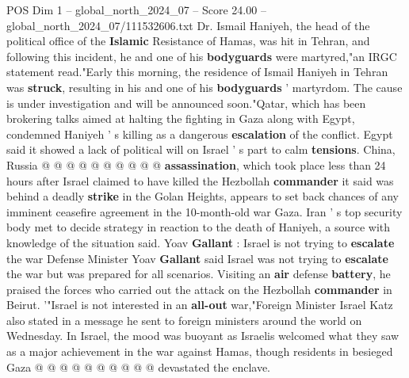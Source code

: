\begin{textsample}{POS Dim 1 – global\_north\_2024\_07 – Score 24.00 – global\_north\_2024\_07/111532606.txt}
Dr.
Ismail Haniyeh, the head of the political office of the \textbf{Islamic} Resistance of Hamas, was hit in Tehran, and following this incident, he and one of his \textbf{bodyguards} were martyred,"an IRGC statement read."Early this morning, the residence of Ismail Haniyeh in Tehran was \textbf{struck}, resulting in his and one of his \textbf{bodyguards} ' martyrdom.
The cause is under investigation and will be announced soon."Qatar, which has been brokering talks aimed at halting the fighting in Gaza along with Egypt, condemned Haniyeh ' s killing as a dangerous \textbf{escalation} of the conflict.
Egypt said it showed a lack of political will on Israel ' s part to calm \textbf{tensions}.
China, Russia @ @ @ @ @ @ @ @ @ @ \textbf{assassination}, which took place less than 24 hours after Israel claimed to have killed the Hezbollah \textbf{commander} it said was behind a deadly \textbf{strike} in the Golan Heights, appears to set back chances of any imminent ceasefire agreement in the 10-month-old war Gaza.
Iran ' s top security body met to decide strategy in reaction to the death of Haniyeh, a source with knowledge of the situation said.
Yoav \textbf{Gallant} : Israel is not trying to \textbf{escalate} the war Defense Minister Yoav \textbf{Gallant} said Israel was not trying to \textbf{escalate} the war but was prepared for all scenarios.
Visiting an \textbf{air} defense \textbf{battery}, he praised the forces who carried out the attack on the Hezbollah \textbf{commander} in Beirut. '"Israel is not interested in an \textbf{all-out} war,"Foreign Minister Israel Katz also stated in a message he sent to foreign ministers around the world on Wednesday.
In Israel, the mood was buoyant as Israelis welcomed what they saw as a major achievement in the war against Hamas, though residents in besieged Gaza @ @ @ @ @ @ @ @ @ @ devastated the enclave.

\end{textsample}
